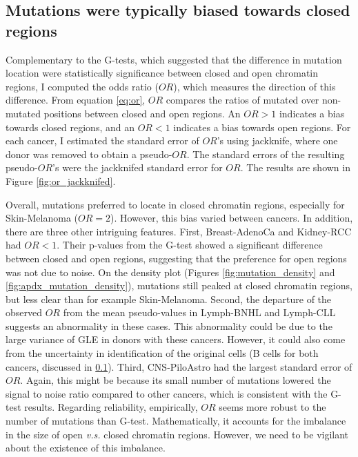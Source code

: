 

\subsection{Mutations were typically biased towards closed regions}
Complementary to the G-tests, which suggested that the difference in mutation location were statistically significance between closed and open chromatin regions, I computed the odds ratio ($OR$), which measures the direction of this difference. From equation \ref{eq:or}, $OR$ compares the ratios of mutated over non-mutated positions between closed and open regions. An $OR>1$ indicates a bias towards closed regions, and an $OR<1$ indicates a bias towards open regions. For each cancer, I estimated the standard error of $OR$'s using jackknife, where one donor was removed to obtain a pseudo-$OR$. The standard errors of the resulting pseudo-$OR$'s were the jackknifed standard error for $OR$. The results are shown in Figure \ref{fig:or_jackknifed}.



Overall, mutations preferred to locate in closed chromatin regions, especially for Skin-Melanoma ($OR=2$). However, this bias varied between cancers. In addition, there are three other intriguing features. First, Breast-AdenoCa and Kidney-RCC had $OR<1$. Their p-values from the G-test showed a significant difference between closed and open regions, suggesting that the preference for open regions was not due to noise. On the density plot (Figures \ref{fig:mutation_density} and \ref{fig:apdx_mutation_density}), mutations still peaked at closed chromatin regions, but less clear than for example Skin-Melanoma. Second, the departure of the observed $OR$ from the mean pseudo-values in Lymph-BNHL and Lymph-CLL suggests an abnormality in these cases. This abnormality could be due to the large variance of GLE in donors with these cancers. However, it could also come from the uncertainty in identification of the original cells (B cells for both cancers, discussed in \ref{}). Third, CNS-PiloAstro had the largest standard error of $OR$. Again, this might be because its small number of mutations lowered the signal to noise ratio compared to other cancers, which is consistent with the G-test results. Regarding reliability, empirically, $OR$ seems more robust to the number of mutations than G-test. Mathematically, it accounts for the imbalance in the size of open \textit{v.s.} closed chromatin regions. However, we need to be vigilant about the existence of this imbalance.

